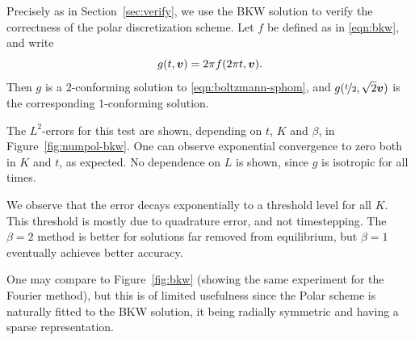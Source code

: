 Precisely as in Section~\vref{sec:verify}, we use the BKW solution to verify the correctness of the polar
discretization scheme. Let $f$ be defined as in \eqref{eqn:bkw}, and write
\begin{equation} \label{eqn:pol-bkw}
    g(t,{\bm v}) = 2\pi f(2\pi t, {\bm v}).
\end{equation}
Then $g$ is a $2$-conforming solution to \eqref{eqn:boltzmann-sphom}, and $g(\nicefrac{t}{2},\sqrt{2}{\bm v})$ is
the corresponding $1$-conforming solution.

The $L^2$-errors for this test are shown, depending on $t$, $K$ and $\beta$, in Figure~\vref{fig:numpol-bkw}.
One can observe exponential convergence to zero both in $K$ and $t$, as expected. No dependence on $L$ is
shown, since $g$ is isotropic for all times.

We observe that the error decays exponentially to a threshold level for all $K$. This threshold is mostly due
to quadrature error, and not timestepping. The $\beta=2$ method is better for solutions far removed from
equilibrium, but $\beta=1$ eventually achieves better accuracy.

One may compare to Figure~\vref{fig:bkw} (showing the same experiment for the Fourier method), but this is of
limited usefulness since the Polar scheme is naturally fitted to the BKW solution, it being radially symmetric
and having a sparse representation.

